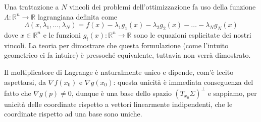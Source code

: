 \begin{remark}
Una trattazione a $N$ vincoli dei problemi dell'ottimizzazione fa uso della funzione $\Lambda: \mathbb{R}^n \to \mathbb{R}$ lagrangiana definita come 
$$
\Lambda(x, \lambda_1, \ldots, \lambda_N) = f(x)-\lambda_1 g_1(x) - \lambda_2 g_2(x) - \ldots - \lambda_N g_N(x)
$$
dove $x \in \mathbb{R}^n$ e le funzioni $g_i(x):\mathbb{R}^n \to \mathbb{R}$ sono le equazioni esplicitate dei nostri vincoli. La teoria per dimostrare che questa formulazione (come l'intuito geometrico ci fa intuire) è pressoché equivalente, tuttavia non verrà dimostrato.
\end{remark}

\begin{remark}
Il moltiplicatore di Lagrange è naturalmente unico e dipende, com'è lecito aspettarsi, da $\nabla f(x_0)$ e $\nabla g(x_0)$: questa unicità è immediata conseguenza del fatto che $\nabla g(p) \neq 0$, dunque è una base dello spazio $(T_{x_0} \Sigma)^{\perp}$ e sappiamo, per unicità delle coordinate rispetto a vettori linearmente indipendenti, che le coordinate rispetto ad una base sono uniche.
\end{remark}
